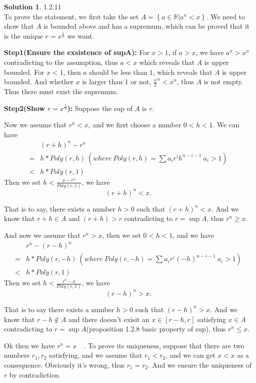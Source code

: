 \documentclass{article}
\theoremstyle{definition}
\newtheorem{sol}{Solution}[exe]
\begin{document}
\begin{sol} 1.2.11\\
    To prove the statement, we first take the set $A=\left\{a\in \mathbb{R}|a^{n}<x\right\}.$ We need to show that $A$ is bounded above and has a supremum, which can be proved that it is the unique $r=x^{\frac{1}{n}}$ we want.
  
\noindent\textbf{Step1(Ensure the exsistence of supA):} For $x>1$, if $a>x$, we have $a^{n}>x^{n}$ contradicting to the assumption, thus $a<x$ which reveals that $A$ is upper bounded.
For $x<1$, then $a$ should be less than $1$, which reveals that $A$ is upper bounded. And whether $x$ is larger than 1 or not, $\frac{x}{2}^{n}<x^{n}$, thus $A$ is not empty. Thus there must exist the supremum.

\noindent\textbf{Step2(Show $r=x^{\frac{1}{n}}$):} Suppose the sup of $A$ is $r$.

Now we assume that $r^{n}<x$, and we first choose a number $0<h<1$. We can have
\begin{align*}
    &(r+h)^{n}-r^{n}\\
    =&h*Poly(r,h) \ (where\ Poly(r,h)=\sum a_{i}r^{i}h^{n-i-1}\ a_{i}>1)\\
    <&h*Poly(r,1)
\end{align*}
Then we set $h<\frac{x-r^{n}}{Poly(r,1)}$, we have
$$(r+h)^{n}<x.$$

That is to say, there exists a number $h>0$ such that $(r+h)^{n}<x$. And we know that $r+h\in A$ and $(r+h)>r$ 
contradicting to $r=\sup A$, thus $r^{n}\geq x$.

And now we assume that $r^{n}>x$, then we set $0<h<1$, and we have
\begin{align*}
    &r^{n}-(r-h)^{n}\\
    =&h*Poly(r,-h) \ (where\ Poly(r,-h)=\sum a_{i}r^{i}(-h)^{n-i-1}\ a_{i}>1)\\
    <&h*Poly(r,1)
\end{align*}
Then we set $h<\frac{r^{n}-x}{Poly(r,1)}$, we have
$$(r-h)^{n}>x.$$

That is to say there exists a number $h>0$ such that $(r-h)^{n}>x$. And we know that $r-h\notin A$ and there doesn't exisit an $x\in[r-h,r]$ satisfying 
$x\in A$ contradicting to $r=\sup A$(proposition 1.2.8 basic property of sup), thus $r^{n}\leq x$.

Ok then we have $r^{n}=x$~~. To prove its uniqueness, suppose that there are two numbers $r_{1},r_{2}$ satisfying, and we assume that $r_{1}<r_{2}$, and we can get 
$x<x$ as a consequence. Obviously it's wrong, thus $r_{1}=r_{2}$. And we ensure the uniqueness of $r$ by contradiction.

\end{sol}
\end{document}
